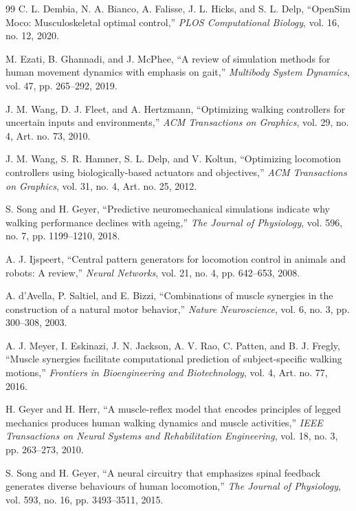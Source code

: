 \documentclass[acmtog,screen]{acmart}
\begin{document}
\begin{thebibliography}{99}
C. L. Dembia, N. A. Bianco, A. Falisse, J. L. Hicks, and S. L. Delp,
``OpenSim Moco: Musculoskeletal optimal control,'' \textit{PLOS Computational
Biology}, vol. 16, no. 12, 2020.

M. Ezati, B. Ghannadi, and J. McPhee, ``A review of simulation methods for
human movement dynamics with emphasis on gait,'' \textit{Multibody System
Dynamics}, vol. 47, pp. 265--292, 2019.

J. M. Wang, D. J. Fleet, and A. Hertzmann, ``Optimizing walking controllers for
uncertain inputs and environments,'' \textit{ACM Transactions on Graphics},
vol. 29, no. 4, Art. no. 73, 2010.

J. M. Wang, S. R. Hamner, S. L. Delp, and V. Koltun, ``Optimizing locomotion
controllers using biologically-based actuators and objectives,'' \textit{ACM
Transactions on Graphics}, vol. 31, no. 4, Art. no. 25, 2012.

S. Song and H. Geyer, ``Predictive neuromechanical simulations indicate why
walking performance declines with ageing,'' \textit{The Journal of Physiology},
vol. 596, no. 7, pp. 1199--1210, 2018.

A. J. Ijspeert, ``Central pattern generators for locomotion control in animals
and robots: A review,'' \textit{Neural Networks}, vol. 21, no. 4, pp.
642--653, 2008.

A. d'Avella, P. Saltiel, and E. Bizzi, ``Combinations of muscle synergies in
the construction of a natural motor behavior,'' \textit{Nature Neuroscience},
vol. 6, no. 3, pp. 300--308, 2003.

A. J. Meyer, I. Eskinazi, J. N. Jackson, A. V. Rao, C. Patten, and
B. J. Fregly, ``Muscle synergies facilitate computational prediction of
subject-specific walking motions,'' \textit{Frontiers in Bioengineering and
Biotechnology}, vol. 4, Art. no. 77, 2016.

H. Geyer and H. Herr, ``A muscle-reflex model that encodes principles of
legged mechanics produces human walking dynamics and muscle activities,''
\textit{IEEE Transactions on Neural Systems and Rehabilitation Engineering},
vol. 18, no. 3, pp. 263--273, 2010.

S. Song and H. Geyer, ``A neural circuitry that emphasizes spinal feedback
generates diverse behaviours of human locomotion,'' \textit{The Journal of
Physiology}, vol. 593, no. 16, pp. 3493--3511, 2015.


\end{thebibliography}
\end{document}
